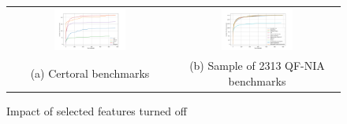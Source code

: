 \begin{figure}[htbp]
   \centering
   \begin{tabular}{cc}
    \includegraphics[width=0.45\textwidth]{figures/compare-benchmark-submission.png} &
    \includegraphics[width=0.45\textwidth]{figures/qf-nia-small.png} \\
      (a) Certoral benchmarks &
    (b) Sample of 2313 QF-NIA benchmarks
    \end{tabular}
   \caption{Impact of selected features turned off\label{fig:features}}
 \end{figure}
 

